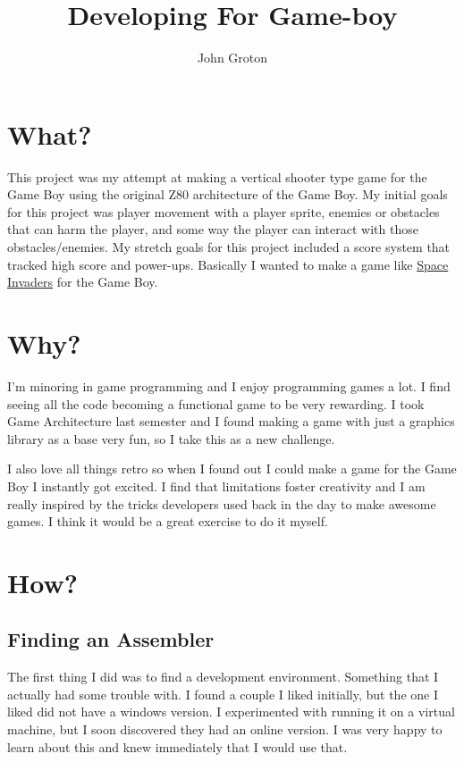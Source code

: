 \documentclass{article}
\title{Developing For Game-boy}
\author{John Groton}
\begin{document}
\maketitle



\section{What?}

This project was my attempt at making a vertical shooter type game for the Game Boy using the original Z80 architecture of the Game Boy. My initial goals for this project was player movement with a player sprite, enemies or obstacles that can harm the player, and some way the player can interact with those obstacles/enemies. My stretch goals for this project included a score system that tracked high score and power-ups. Basically I wanted to make a game like \href{https://en.wikipedia.org/wiki/Space_Invaders}{Space Invaders} for the Game Boy. 

\section{Why?}

I'm minoring in game programming and I enjoy programming games a lot. I find seeing all the code becoming a functional game to be very rewarding. I took Game Architecture last semester and I found making a game with just a graphics library as a base very fun, so I take this as a new challenge.

I also love all things retro so when I found out I could make a game for the Game Boy I instantly got excited. I find that limitations foster creativity and I am really inspired by the tricks developers used back in the day to make awesome games. I think it would be a great exercise to do it myself.

\section{How?}

\subsection{Finding an Assembler}

The first thing I did was to find a development environment. Something that I actually had some trouble with. I found a couple I liked initially, but the one I liked did not have a windows version. I experimented with running it on a virtual machine, but I soon discovered they had an online version. I was very happy to learn about this and knew immediately that I would use that. 
\end{document}
